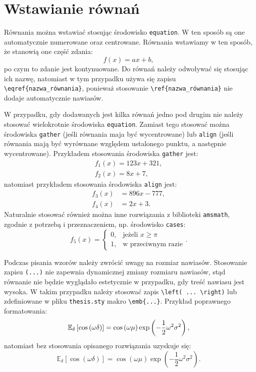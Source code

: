 \section{Wstawianie równań}

Równania można wstawiać stosując środowisko \verb|equation|. W ten sposób są one automatycznie numerowane oraz centrowane. Równania wstawiamy w ten sposób, że stanowią one część zdania:
\begin{equation}
f(x) = ax + b \label{eq:rownanie_1},
\end{equation}
po czym to zdanie jest kontynuowane. Do równań należy odwoływać się stosując ich nazwę, natomiast w tym przypadku używa się zapisu \verb|\eqref{nazwa_równania}|, ponieważ stosowanie \verb|\ref{nazwa_równania}| nie dodaje automatycznie nawiasów.

W przypadku, gdy dodawanych jest kilka równań jedno pod drugim nie należy stosować wielokrotnie środowiska \verb|equation|. Zamiast tego stosować można środowiska \verb|gather| (jeśli równania maja być wycentrowane) lub \verb|align| (jeśli równania mają być wyrównane względem ustalonego punktu, a następnie wycentrowane). Przykładem stosowania środowiska \verb|gather| jest:
\begin{gather}
f_{1}(x) = 123 x + 321 \label{eq:rownanie_2}, \\
f_{2}(x) = 8 x + 7 \label{eq:rownanie_3},
\end{gather}
natomiast przykładem stosowania środowiska \verb|align| jest:
\begin{align}
f_{3}(x) &= 896 x - 777 \label{eq:rownanie_4}, \\
f_{4}(x) &= 2 x + 3 \label{eq:rownanie_5}.
\end{align}
Naturalnie stosować również można inne rozwiązania z biblioteki \verb|amsmath|, zgodnie z potrzebą i przeznaczeniem, np. środowisko \verb|cases|:
\begin{equation}
f_{5}(x) =
\begin{cases}
0, & \text{jeżeli $x \ge \pi$}  \\
1, & \text{w przeciwnym razie}
\end{cases}
\label{eq:rownanie_6}.
\end{equation}

Podczas pisania wzorów należy zwrócić uwagę na rozmiar nawiasów. Stosowanie zapisu \verb|(...)| nie zapewnia dynamicznej zmiany rozmiaru nawiasów, stąd równanie nie będzie wyglądało estetycznie w przypadku, gdy treść nawiasu jest wysoka. W takim przypadku należy stosować zapis \verb|\left( ... \right)| lub zdefiniowane w pliku \texttt{thesis.sty} makro \verb|\emb{...}|. Przykład poprawnego formatowania:
\begin{equation}
\mathbb{E}_\delta \left[ \cos \left(\omega \delta\right) \right] = \cos \left(\omega \mu\right) \exp \left(-\frac{1}{2} \omega^2 \sigma^2\right) \label{eq:rownanie_7_dobrze},
\end{equation}
natomiast bez stosowania opisanego rozwiązania uzyskuje się:
\begin{equation}
\mathbb{E}_\delta [ \cos (\omega \delta) ] = \cos (\omega \mu) \exp (-\frac{1}{2} \omega^2 \sigma^2) \label{eq:rownanie_7_zle}.
\end{equation}

